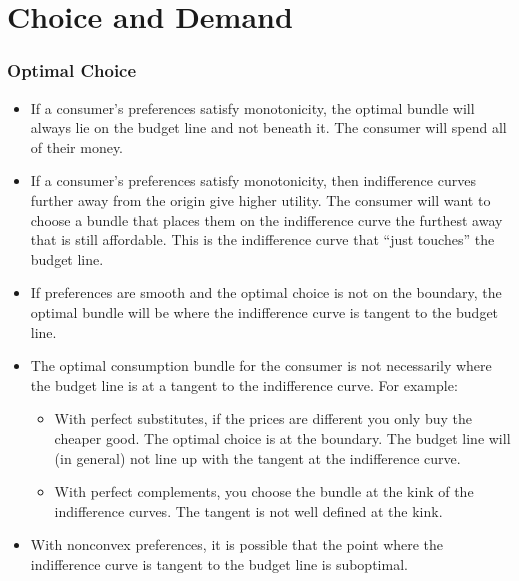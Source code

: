 \documentclass{article}
\begin{document}
\section{Choice and Demand}
\subsubsection*{Optimal Choice}
\begin{itemize}
  \item If a consumer's preferences satisfy monotonicity, the optimal bundle will always lie on the budget line and not beneath it. The consumer will spend all of their money.
  \item If a consumer's preferences satisfy monotonicity, then indifference curves further away from the origin give higher utility. The consumer will want to choose a bundle that places them on the indifference curve the furthest away that is still affordable. This is the indifference curve that ``just touches'' the budget line.
  \item If preferences are smooth and the optimal choice is not on the boundary, the optimal bundle will be where the indifference curve is tangent to the budget line.
  \item The optimal consumption bundle for the consumer is not necessarily where the budget line is at a tangent to the indifference curve. For example:
    \begin{itemize}
      \item With perfect substitutes, if the prices are different you only buy the cheaper good. The optimal choice is at the boundary. The budget line will (in general) not line up with the tangent at the indifference curve.
      \item With perfect complements, you choose the bundle at the kink of the indifference curves. The tangent is not well defined at the kink.
    \end{itemize}
  \item With nonconvex preferences, it is possible that the point where the indifference curve is tangent to the budget line is suboptimal.
\end{itemize}
\end{document}
